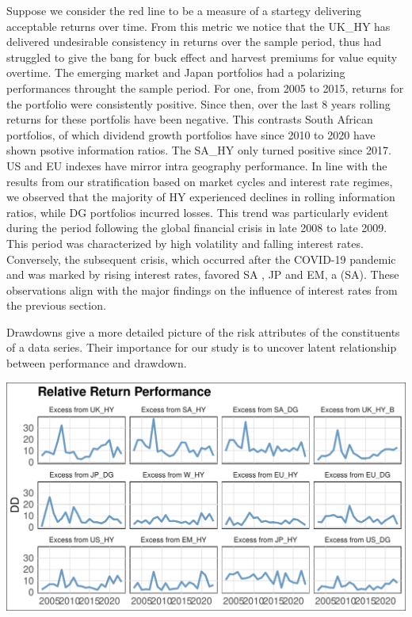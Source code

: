 \documentclass[10pt,preprint, authoryear]{elsarticle}
\let\origfigure\figure
\let\endorigfigure\endfigure
\renewenvironment{figure}[1][2] {
    \expandafter\origfigure\expandafter[H]
} {
    \endorigfigure
}
\numberwithin{equation}{section}
\numberwithin{figure}{section}
\numberwithin{table}{section}
\begin{document}
Suppose we consider the red line to be a measure of a startegy
delivering acceptable returns over time. From this metric we notice that
the UK\_HY has delivered undesirable consistency in returns over the
sample period, thus had struggled to give the bang for buck effect and
harvest premiums for value equity overtime. The emerging market and
Japan portfolios had a polarizing performances throught the sample
period. For one, from 2005 to 2015, returns for the portfolio were
consistently positive. Since then, over the last 8 years rolling returns
for these portfolis have been negative. This contrasts South African
portfolios, of which dividend growth portfolios have since 2010 to 2020
have shown psotive information ratios. The SA\_HY only turned positive
since 2017. US and EU indexes have mirror intra geography performance.
In line with the results from our stratification based on market cycles
and interest rate regimes, we observed that the majority of HY
experienced declines in rolling information ratios, while DG portfolios
incurred losses. This trend was particularly evident during the period
following the global financial crisis in late 2008 to late 2009. This
period was characterized by high volatility and falling interest rates.
Conversely, the subsequent crisis, which occurred after the COVID-19
pandemic and was marked by rising interest rates, favored SA , JP and
EM, a (SA). These observations align with the major findings on the
influence of interest rates from the previous section.

Drawdowns give a more detailed picture of the risk attributes of the
constituents of a data series. Their importance for our study is to
uncover latent relationship between performance and drawdown.

\begin{figure}[H]

\includegraphics{Much_Ado_About_Dividends_files/figure-latex/Figure2-1} \hfill{}

\caption{Rolling 3 Year Returns \label{fig2}}\label{fig:Figure2}
\end{figure}
\end{document}
